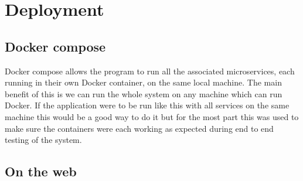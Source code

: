 \chapter{Deployment}
\label{cha:deployment}

\section{Docker compose}
Docker compose allows the program to run all the associated microservices, each running in their own Docker container, on the same local machine. The main benefit of this is we can run the whole system on any machine which can run Docker. If the application were to be run like this with all services on the same machine this would be a good way to do it but for the most part this was used to make sure the containers were each working as expected during end to end testing of the system.

\section{On the web}

